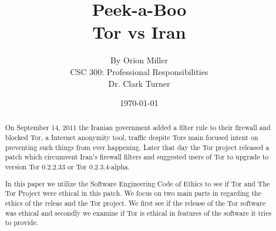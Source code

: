 \documentclass[11pt]{article}
\begin{document}
\title{\vfill Peek-a-Boo \\ \large Tor vs Iran}
\author{ 
  By Orion Miller\vspace{10pt} \\
  CSC 300: Professional Responsibilities \vspace{10pt} \\
  Dr. Clark Turner\vspace{10pt} \\
}
\date{\today}

\maketitle

\vfill  %
\begin{abstract} 

On September 14, 2011 the Iranian government added a filter rule to their
firewall and blocked Tor, a Internet anonymity tool, traffic despite Tors main
focused intent on preventing such things from ever happening.
\cite{IranBlocksTorSameDayFix} Later that day the Tor project released a patch
which circumvent Iran's firewall filters and suggested users of Tor to upgrade
to version Tor 0.2.2.33 or Tor 0.2.3.4-alpha.\cite{IranBlocksTorSameDayFix}

In this paper we utilize the Software Engineering Code of Ethics to see if Tor
and The Tor Project were ethical in this patch. We focus on two main parts in
regarding the ethics of the releas and the Tor project. We first see if the
release of the Tor software was ethical and secondly we examine if Tor is
ethical in features of the software it tries to provide.


\end{abstract}

\thispagestyle{empty} %

\newpage

\thispagestyle{empty}  %

\tableofcontents

\newpage

\end{document}
